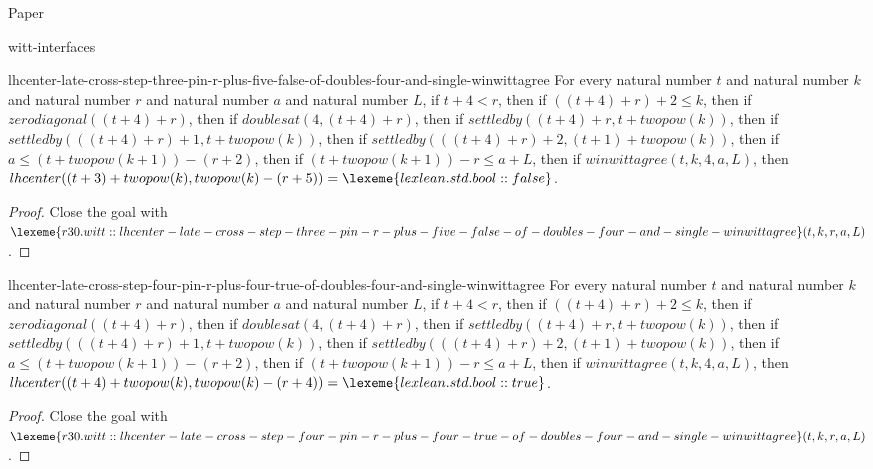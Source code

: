 \begin{lexlean}{Paper}
\begin{section}{witt-interfaces}
  \begin{theorem}{lhcenter-late-cross-step-three-pin-r-plus-five-false-of-doubles-four-and-single-winwittagree}
  For every natural number \(t\) and natural number \(k\) and natural number \(r\) and natural number \(a\) and natural number \(L\), if \(t + 4 < r\), then if \(((t + 4) + r) + 2 ≤ k\), then if \(zerodiagonal((t + 4) + r)\), then if \(doublesat(4, (t + 4) + r)\), then if \(settledby((t + 4) + r, t + twopow(k))\), then if \(settledby(((t + 4) + r) + 1, t + twopow(k))\), then if \(settledby(((t + 4) + r) + 2, (t + 1) + twopow(k))\), then if \(a ≤ (t + twopow(k + 1)) - (r + 2)\), then if \((t + twopow(k + 1)) - r ≤ a + L\), then if \(winwittagree(t, k, 4, a, L)\), then \(lhcenter((t + 3) + twopow(k), twopow(k) - (r + 5)) = \lexeme{lexlean.std.bool::false}\).
  \begin{proof}
  Close the goal with \(\lexeme{r30.witt::lhcenter-late-cross-step-three-pin-r-plus-five-false-of-doubles-four-and-single-winwittagree}(t, k, r, a, L)\).
  \end{proof}
  \end{theorem}

  \begin{theorem}{lhcenter-late-cross-step-four-pin-r-plus-four-true-of-doubles-four-and-single-winwittagree}
  For every natural number \(t\) and natural number \(k\) and natural number \(r\) and natural number \(a\) and natural number \(L\), if \(t + 4 < r\), then if \(((t + 4) + r) + 2 ≤ k\), then if \(zerodiagonal((t + 4) + r)\), then if \(doublesat(4, (t + 4) + r)\), then if \(settledby((t + 4) + r, t + twopow(k))\), then if \(settledby(((t + 4) + r) + 1, t + twopow(k))\), then if \(settledby(((t + 4) + r) + 2, (t + 1) + twopow(k))\), then if \(a ≤ (t + twopow(k + 1)) - (r + 2)\), then if \((t + twopow(k + 1)) - r ≤ a + L\), then if \(winwittagree(t, k, 4, a, L)\), then \(lhcenter((t + 4) + twopow(k), twopow(k) - (r + 4)) = \lexeme{lexlean.std.bool::true}\).
  \begin{proof}
  Close the goal with \(\lexeme{r30.witt::lhcenter-late-cross-step-four-pin-r-plus-four-true-of-doubles-four-and-single-winwittagree}(t, k, r, a, L)\).
  \end{proof}
  \end{theorem}


\end{section}
\end{lexlean}
